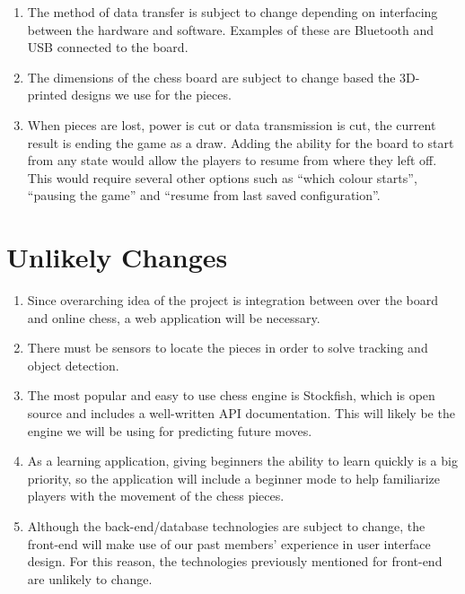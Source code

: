 \documentclass[12pt]{article}
\begin{document}
{\begin{enumerate}[{LC}1., leftmargin=2\parindent]
    first edition of this application. As demand for the application increases, the load capacity must also increase to support a
    larger user base.
    \item The method of data transfer is subject to change depending on
    interfacing between the hardware and software. Examples of these are Bluetooth and USB connected to the board.
    \item The dimensions of the chess board are subject to change based
    the 3D-printed designs we use for the pieces. 
    \item When pieces are lost, power is cut or data transmission is cut, the current result is ending the game as a draw. Adding the ability for the board to start from any state
    would allow the players to resume from where they left off. This would require several other options such as ``which colour starts'', ``pausing the game'' and ``resume from
    last saved configuration''.
\end{enumerate}
  
\section{Unlikely Changes}    
\noindent
\begin{enumerate}[{UC}1., leftmargin=2\parindent]
    \item Since overarching idea of the project is integration between
    over the board and online chess, a web application will be necessary.
    \item There must be sensors to locate the pieces in order to solve tracking and object detection.
    \item The most popular and easy to use chess engine is Stockfish, which is 
    open source and includes a well-written API documentation. This will likely be the engine we will be using for predicting future moves.
    \item As a learning application, giving beginners the ability to learn quickly
    is a big priority, so the application will include a beginner mode to help familiarize players with the movement of the chess pieces.
    \item Although the back-end/database technologies are subject to change,
    the front-end will make use of our past members' experience in user interface design. For this reason, the technologies
    previously mentioned for front-end are unlikely to change.
\end{enumerate}

}
\end{document}
